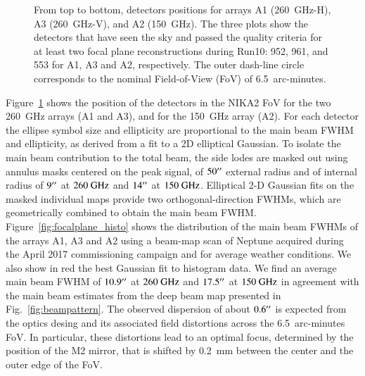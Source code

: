 \documentclass[]{aa} %
\begin{document}
\begin{figure}[h]
      \caption{From top to bottom, detectors positions for arrays A1 (260~GHz-H), A3 (260~GHz-V), and A2 (150~GHz). The three plots show the detectors that have seen the sky and passed the quality criteria for at least two focal plane reconstructions during Run10: 952, 961, and 553 for A1, A3 and A2, respectively. The outer dash-line circle corresponds to the nominal Field-of-View (FoV) of 6.5~arc-minutes.
         \label{fig:focalplane}}
\end{figure}

Figure~\ref{fig:focalplane} shows the position of the detectors in the NIKA2 FoV for the two 260~GHz arrays (A1 and A3), and for the 150~GHz array (A2). For each detector the ellipse symbol size and ellipticity are proportional to the main beam FWHM and ellipticity, as derived from a fit to a 2D elliptical Gaussian. To isolate the main beam contribution to the total beam, the side lodes are masked out using annulus masks centered on the peak signal, of $50\hbox{$^{\prime\prime}$}$ external radius and of internal radius of $9\hbox{$^{\prime\prime}$}$ at $260~\rm{GHz}$ and $14\hbox{$^{\prime\prime}$}$ at $150~\rm{GHz}$. Elliptical 2-D Gaussian fits on the masked individual maps provide two orthogonal-direction FWHMs, which are geometrically combined to obtain the main beam FWHM. Figure~\ref{fig:focalplane_histo} shows the distribution of the main beam FWHMs of the arrays A1, A3 and A2 using a beam-map scan of Neptune acquired during the April 2017 commissioning campaign and for average weather conditions. We also show in red the best Gaussian fit to histogram data. We find an average main beam FWHM of $10.9\hbox{$^{\prime\prime}$}$ at $260~\rm{GHz}$ and $17.5\hbox{$^{\prime\prime}$}$ at $150~\rm{GHz}$ in agreement with the main beam estimates from the deep beam map presented in Fig.~\ref{fig:beampattern}. The observed dispersion of about $0.6\hbox{$^{\prime\prime}$}$ is expected from the optics desing and its associated field distortions across the 6.5~arc-minutes FoV. In particular, these distortions lead to an optimal focus, determined by the position of the M2 mirror, that is shifted by 0.2~\rm{mm} between the center and the outer edge of the FoV.
 
\end{document}
